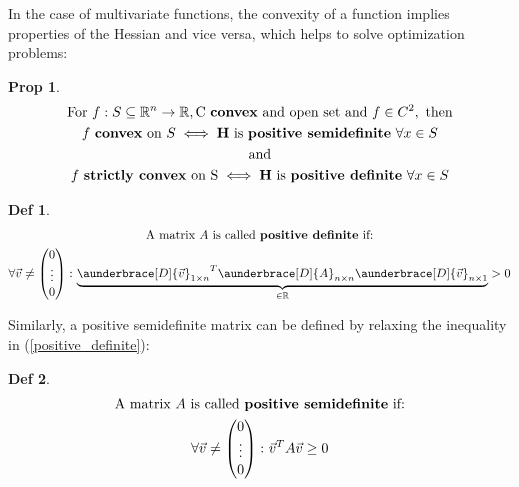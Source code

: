 \documentclass[../convex_optimization.tex]{subfiles}
\theoremstyle{definition} \newtheorem{defi}{Def}
\theoremstyle{definition} \newtheorem{prop}{Prop}
\begin{document}
In the case of multivariate functions, the convexity of a function
implies properties of the Hessian and vice versa, which
helps to solve optimization problems:
\begin{prop}
\begin{gather}
    \text{For } f: S \subseteq \mathbb R^n \to \mathbb R,
    \text{C \textbf{convex} and open set and } f \in C^2,
    \text{ then}\nonumber\\
    f \text{ \textbf{convex} on }S \iff
    \mathbf H \text{ is \textbf{positive semidefinite} } \forall x \in S\label{hessian_convex}\\
    \text{and}\nonumber\\
    f \text{ \textbf{strictly convex} on S} \iff
    \mathbf H \text{ is \textbf{positive definite} } \forall x \in S
    \label{positive_definite}
\end{gather}
\end{prop}
\begin{defi}
\begin{gather}
    \text{A matrix $A$ is called \textbf{positive definite} if:}
    \nonumber\\
    \forall \vec{v} \neq 
    \begin{pmatrix} 0 \\ \vdots \\ 0
    \end{pmatrix}\colon
    \rlap{\ensuremath{\underbrace{\phantom{
                    {\aunderbrace[D]{\vec{v}}_{1\times n}}^T
                    \aunderbrace[D]{A}_{n\times n}
                    \aunderbrace[D]{\vec{v}}_{n\times 1}
    }}_{\in \mathbb R}}}
    {\aunderbrace[D]{\vec{v}}_{1\times n}}^T
    \aunderbrace[D]{A}_{n\times n}
    \aunderbrace[D]{\vec{v}}_{n\times 1}
    > 0
\end{gather}
\end{defi}
Similarly, a positive semidefinite matrix can be defined by relaxing the inequality in (\ref{positive_definite}):
\begin{defi}
\begin{gather}
    \text{A matrix $A$ is called \textbf{positive semidefinite} if:}
    \nonumber\\
    \forall \vec{v} \neq 
    \begin{pmatrix} 0 \\ \vdots \\ 0
    \end{pmatrix}\colon
    \vec{v}^T\space A\space \vec{v} \geq 0
\end{gather}
\end{defi}
\end{document}
